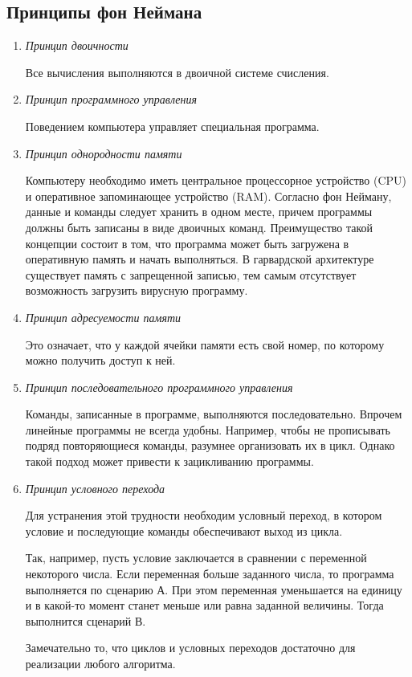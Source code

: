 \subsection*{Принципы фон Неймана}
\begin {enumerate}
\item \emph{Принцип двоичности}

Все вычисления выполняются в двоичной системе счисления.

\item \emph{Принцип программного управления}

Поведением компьютера управляет специальная программа.

\item \emph{Принцип однородности памяти}

Компьютеру необходимо иметь центральное процессорное устройство (CPU) и оперативное запоминающее устройство (RAM). Согласно фон Нейману, данные и команды следует хранить в одном месте, причем программы должны быть записаны  в виде двоичных команд. Преимущество такой концепции состоит в том, что программа может быть загружена в оперативную память и начать выполняться.
В гарвардской архитектуре существует память с запрещенной записью, тем самым отсутствует возможность загрузить вирусную программу.

\item \emph{Принцип адресуемости памяти}

Это означает, что у каждой ячейки памяти есть свой номер, по которому можно получить доступ к ней.

\item \emph{Принцип последовательного программного управления} 

Команды, записанные в программе, выполняются последовательно. 
Впрочем линейные программы не всегда удобны. Например, чтобы не прописывать подряд повторяющиеся команды, разумнее организовать их в цикл.  Однако такой подход может привести к зацикливанию программы.

\item \emph{Принцип условного перехода}

Для устранения этой трудности необходим условный переход, в котором условие и последующие команды обеспечивают выход из цикла.

\begin{example}
	Так, например, пусть условие заключается в сравнении с переменной  некоторого числа.  Если переменная больше заданного числа,  то программа выполняется по сценарию А. При этом переменная уменьшается на единицу и в какой-то момент станет меньше или равна заданной величины. Тогда выполнится сценарий В.
\end{example}

Замечательно то, что циклов и условных переходов достаточно для  реализации любого алгоритма. 

\end {enumerate}


